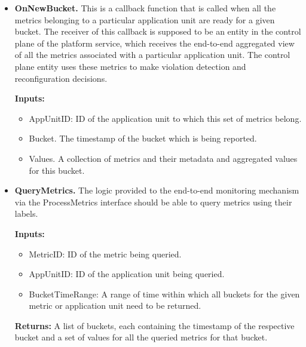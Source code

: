 \begin{itemize}
\item \textbf{OnNewBucket.} This is a callback function that is called when all the metrics belonging to a particular application unit are ready for a given bucket. The receiver of this callback is supposed to be an entity in the control plane of the platform service, which receives the end-to-end aggregated view of all the metrics associated with a particular application unit. The control plane entity uses these metrics to make violation detection and reconfiguration decisions.
\par \noindent \textbf{Inputs:}
\begin{itemize}
\item AppUnitID: ID of the application unit to which this set of metrics belong.
\item Bucket. The timestamp of the bucket which is being reported.
\item Values. A collection of metrics and their metadata and aggregated values for this bucket.
\end{itemize}
\item \textbf{QueryMetrics. }The logic provided to the end-to-end monitoring mechanism via the ProcessMetrics interface should be able to query metrics using their labels. 
\par \noindent \textbf{Inputs:}
\begin{itemize}
\item MetricID: ID of the metric being queried.
\item AppUnitID: ID of the application unit being queried.
\item BucketTimeRange: A range of time within which all buckets for the given metric or application unit need to be returned.
\end{itemize}
\par \noindent \textbf{Returns:} A list of buckets, each containing the timestamp of the respective bucket and a set of values for all the queried metrics for that bucket.

\end{itemize}

